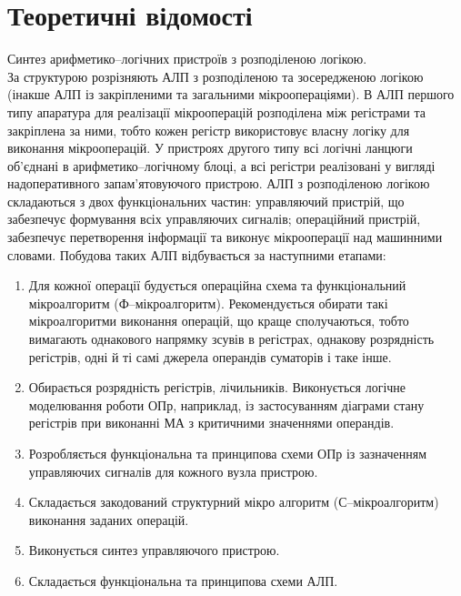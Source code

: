 \documentclass[a4paper, 10pt]{article}
\begin{document}
\section{Теоретичні відомості}
Синтез арифметико--логічних пристроїв з розподіленою логікою.\\
За структурою розрізняють АЛП з розподіленою та зосередженою логікою (інакше АЛП із закріпленими та загальними мікроопераціями).
В АЛП першого типу апаратура для реалізації мікрооперацій розподілена між регістрами та закріплена за ними, тобто кожен регістр використовує власну логіку для виконання мікрооперацій. У пристроях другого типу всі логічні ланцюги об'єднані в арифметико--логічному блоці, а всі регістри реалізовані у вигляді надоперативного запам'ятовуючого пристрою.
АЛП з розподіленою логікою складаються з двох функціональних частин: управляючий пристрій, що забезпечує формування всіх управляючих сигналів; операційний пристрій, забезпечує перетворення інформації та виконує мікрооперації над машинними словами.
Побудова таких АЛП відбувається за наступними етапами:
\begin{enumerate}
    \item Для кожної операції будується операційна схема та функціональний мікроалгоритм (Ф--мікроалгоритм). Рекомендується обирати такі мікроалгоритми виконання операцій, що краще сполучаються, тобто вимагають однакового напрямку зсувів в регістрах, однакову розрядність регістрів, одні й ті самі джерела операндів суматорів і таке інше.
    \item Обирається розрядність регістрів, лічильників. Виконується логічне моделювання роботи ОПр, наприклад, із застосуванням діаграми стану регістрів при виконанні МА з критичними значеннями операндів.
    \item Розробляється функціональна та принципова схеми ОПр із зазначенням управляючих сигналів для кожного вузла пристрою.
    \item Складається закодований структурний мікро алгоритм (С--мікроалгоритм) виконання заданих операцій.
    \item Виконується синтез управляючого пристрою.
    \item Складається функціональна та принципова схеми АЛП.
\end{enumerate}
\end{document}
